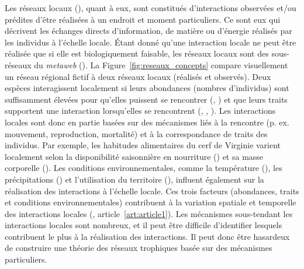 Les réseaux locaux (\cite{Poisot2012Dissimilarity}), quant à eux, sont
constitués d'interactions observées et/ou prédites d'être réalisées à un endroit
et moment particuliers. Ce sont eux qui décrivent les échanges directs
d'information, de matière ou d'énergie réalisés par les individus à l'échelle
locale. Étant donné qu'une interaction locale ne peut être réalisée que si elle
est biologiquement faisable, les réseaux locaux sont des sous-réseaux du
\textit{metaweb} (\cite{Saravia2022Ecological}). La
Figure~\ref{fig:reseaux_concepts} compare visuellement un réseau régional fictif
à deux réseaux locaux (réalisés et observés). Deux espèces interagissent
localement si leurs abondances (nombres d'individus) sont suffisamment élevées
pour qu'elles puissent se rencontrer (\cite{Canard2012Emergence},
\cite{Canard2014Empirical}) et que leurs traits supportent une interaction
lorsqu'elles se rencontrent (\cite{Bolnick2011Why}, \cite{Gravel2013Inferring},
\cite{Stouffer2011Role}). Les interactions locales sont donc en partie basées
sur des mécanismes liés à la rencontre (p. ex. mouvement, reproduction,
mortalité) et à la correspondance de traits des individus. Par exemple, les
habitudes alimentaires du cerf de Virginie varient localement selon la
disponibilité saisonnière en nourriture (\cite{Short1975Nutrition}) et sa masse
corporelle (\cite{Luna2013Influence}). Les conditions environnementales, comme
la température (\cite{Angilletta2004Temperature}), les précipitations
(\cite{Woodward2012Climate}) et l'utilisation du territoire
(\cite{Tylianakis2007Habitat}), influent également sur la réalisation des
interactions à l'échelle locale. Ces trois facteurs (abondances, traits et
conditions environnementales) contribuent à la variation spatiale et temporelle
des interactions locales (\cite{Poisot2015Species}, article~\ref{art:article1}).
Les mécanismes sous-tendant les interactions locales sont nombreux, et il peut
être difficile d'identifier lesquels contribuent le plus à la réalisation des
interactions. Il peut donc être hasardeux de construire une théorie des réseaux
trophiques basée sur des mécanismes particuliers.  

